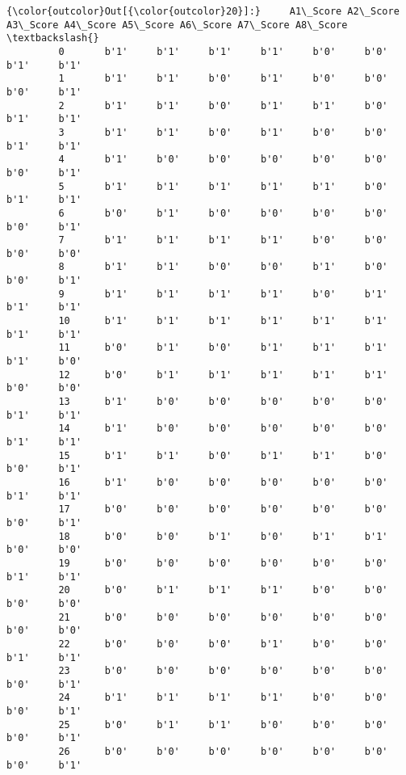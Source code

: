 \documentclass[11pt]{article}
\begin{document}
\begin{Verbatim}[commandchars=\\\{\}]
{\color{outcolor}Out[{\color{outcolor}20}]:}     A1\_Score A2\_Score A3\_Score A4\_Score A5\_Score A6\_Score A7\_Score A8\_Score  \textbackslash{}
         0       b'1'     b'1'     b'1'     b'1'     b'0'     b'0'     b'1'     b'1'   
         1       b'1'     b'1'     b'0'     b'1'     b'0'     b'0'     b'0'     b'1'   
         2       b'1'     b'1'     b'0'     b'1'     b'1'     b'0'     b'1'     b'1'   
         3       b'1'     b'1'     b'0'     b'1'     b'0'     b'0'     b'1'     b'1'   
         4       b'1'     b'0'     b'0'     b'0'     b'0'     b'0'     b'0'     b'1'   
         5       b'1'     b'1'     b'1'     b'1'     b'1'     b'0'     b'1'     b'1'   
         6       b'0'     b'1'     b'0'     b'0'     b'0'     b'0'     b'0'     b'1'   
         7       b'1'     b'1'     b'1'     b'1'     b'0'     b'0'     b'0'     b'0'   
         8       b'1'     b'1'     b'0'     b'0'     b'1'     b'0'     b'0'     b'1'   
         9       b'1'     b'1'     b'1'     b'1'     b'0'     b'1'     b'1'     b'1'   
         10      b'1'     b'1'     b'1'     b'1'     b'1'     b'1'     b'1'     b'1'   
         11      b'0'     b'1'     b'0'     b'1'     b'1'     b'1'     b'1'     b'0'   
         12      b'0'     b'1'     b'1'     b'1'     b'1'     b'1'     b'0'     b'0'   
         13      b'1'     b'0'     b'0'     b'0'     b'0'     b'0'     b'1'     b'1'   
         14      b'1'     b'0'     b'0'     b'0'     b'0'     b'0'     b'1'     b'1'   
         15      b'1'     b'1'     b'0'     b'1'     b'1'     b'0'     b'0'     b'1'   
         16      b'1'     b'0'     b'0'     b'0'     b'0'     b'0'     b'1'     b'1'   
         17      b'0'     b'0'     b'0'     b'0'     b'0'     b'0'     b'0'     b'1'   
         18      b'0'     b'0'     b'1'     b'0'     b'1'     b'1'     b'0'     b'0'   
         19      b'0'     b'0'     b'0'     b'0'     b'0'     b'0'     b'1'     b'1'   
         20      b'0'     b'1'     b'1'     b'1'     b'0'     b'0'     b'0'     b'0'   
         21      b'0'     b'0'     b'0'     b'0'     b'0'     b'0'     b'0'     b'0'   
         22      b'0'     b'0'     b'0'     b'1'     b'0'     b'0'     b'1'     b'1'   
         23      b'0'     b'0'     b'0'     b'0'     b'0'     b'0'     b'0'     b'1'   
         24      b'1'     b'1'     b'1'     b'1'     b'0'     b'0'     b'0'     b'1'   
         25      b'0'     b'1'     b'1'     b'0'     b'0'     b'0'     b'0'     b'1'   
         26      b'0'     b'0'     b'0'     b'0'     b'0'     b'0'     b'0'     b'1'   

\end{Verbatim}
\end{document}
